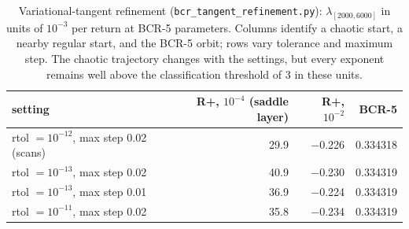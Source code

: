 \begin{table}[!tbp]
\centering\small
\caption{Variational-tangent refinement (\texttt{bcr\_tangent\_refinement.py}): $\lambda_{[2000,6000]}$ in units of
$10^{-3}$ per return at BCR-5 parameters.
Columns identify a chaotic start, a nearby regular start, and the BCR-5 orbit; rows vary tolerance and maximum step.
The chaotic trajectory changes with the settings, but every exponent remains well above the classification threshold
of 3 in these units.}
\label{tab:refinement}
\setlength{\tabcolsep}{6pt}
\begin{tabular}{lrrr}
\toprule
setting & R+, $10^{-4}$ (saddle layer) & R+, $10^{-2}$ & BCR-5 \\
\midrule
rtol $= 10^{-12}$, max step 0.02 (scans) & 29.9 & $-$0.226 & 0.334318 \\
rtol $= 10^{-13}$, max step 0.02 & 40.9 & $-$0.230 & 0.334319 \\
rtol $= 10^{-13}$, max step 0.01 & 36.9 & $-$0.224 & 0.334319 \\
rtol $= 10^{-11}$, max step 0.02 & 35.8 & $-$0.234 & 0.334319 \\
\bottomrule
\end{tabular}
\end{table}
